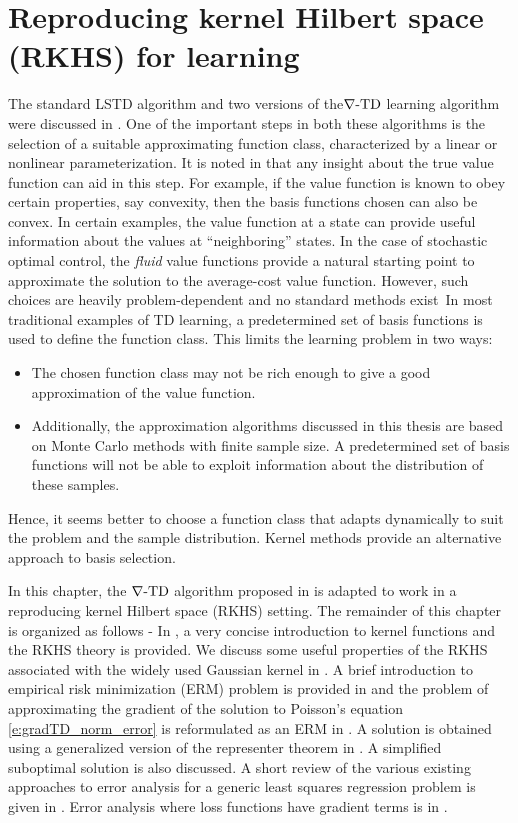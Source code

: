 \chapter{Reproducing kernel Hilbert space (RKHS) for learning}
\label{ch:rkhs}
The standard LSTD algorithm and two versions of the$\nabla\text{-TD}$ learning algorithm were discussed in . One of the important steps in both these algorithms is the selection of a suitable approximating function class, characterized by  a linear or nonlinear parameterization. It is noted in \cite{ctcn} that any insight about the true value function can aid in this step. For example, if the value function is known to obey certain properties, say convexity, then the basis functions chosen can also be convex.  In certain examples, the value function at a state can provide useful information about the values at ``neighboring'' states. In the case of stochastic optimal control, the \textit{fluid} value functions provide a natural starting point to approximate the solution to the average-cost value function. However, such choices are heavily problem-dependent and no standard methods exist\ In most traditional examples of TD learning, a predetermined set of basis functions is used to define the function class. This limits the learning problem in two ways:
\begin{itemize}
	\item The chosen function class may not be rich enough to give a good approximation of the value function.
	\item Additionally, the approximation algorithms discussed in this thesis are based on Monte Carlo methods with finite sample size. A predetermined set of basis functions will not be able to exploit information about the distribution of these samples.  
\end{itemize}
Hence, it seems better to choose a function class that adapts dynamically to suit the problem and the sample distribution. Kernel methods provide an alternative approach to basis selection. 

In this chapter, the $\nabla\text{-TD}$ algorithm proposed in  is adapted to work in a reproducing kernel Hilbert space (RKHS) setting.  The remainder of this chapter is organized as follows - In , a very concise introduction to kernel functions and the RKHS theory is provided. We discuss some useful properties of the RKHS associated with the widely used Gaussian kernel in . A brief introduction to empirical risk minimization (ERM) problem is provided in  and the problem of approximating the gradient of the solution to Poisson's equation \eqref{e:gradTD_norm_error} is reformulated as an ERM in . A solution is obtained using a generalized  version of the representer theorem in .  A simplified suboptimal solution is also discussed. A short review of the various existing approaches to error analysis for a generic least squares regression problem is given in . Error analysis where loss functions have gradient terms is in \Section{}.
 
